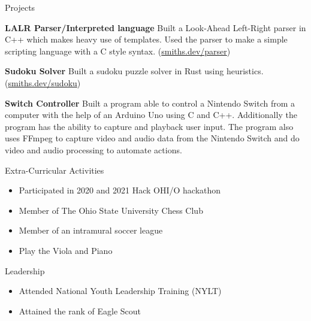 \documentclass{resume}
\begin{document}
\begin{rSection}{Projects}
    \vspace{-1.25em}
    \item \textbf{LALR Parser/Interpreted language} Built a Look-Ahead Left-Right parser in C++ which makes heavy use of templates.
    Used the parser to make a simple scripting language with a C style syntax.
    (\href{https://smiths.dev/parser}{smiths.dev/parser})
    \item \textbf{Sudoku Solver} Built a sudoku puzzle solver in Rust using heuristics.
    (\href{https://smiths.dev/sudoku}{smiths.dev/sudoku})
    \item \textbf{Switch Controller} Built a program able to control a Nintendo Switch
    from a computer with the help of an Arduino Uno using C and C++.
    Additionally the program has the ability to capture and playback user input.
    The program also uses FFmpeg to capture video and audio data from the Nintendo Switch
    and do video and audio processing to automate actions.
\end{rSection}

\begin{rSection}{Extra-Curricular Activities}
    \begin{itemize}
        \item Participated in 2020 and 2021 Hack OHI/O hackathon
        \item Member of The Ohio State University Chess Club
        \item Member of an intramural soccer league
        \item Play the Viola and Piano
    \end{itemize}
\end{rSection}

\begin{rSection}{Leadership}
    \begin{itemize}
        \item Attended National Youth Leadership Training (NYLT)
        \item Attained the rank of Eagle Scout
    \end{itemize}
\end{rSection}
\end{document}
